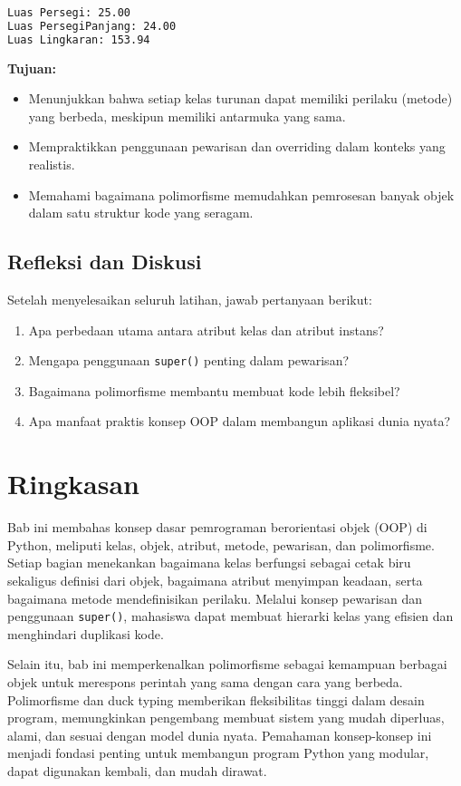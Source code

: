 \begin{lstlisting}[language=bash, caption={Output Program}]
Luas Persegi: 25.00
Luas PersegiPanjang: 24.00
Luas Lingkaran: 153.94
\end{lstlisting}

\textbf{Tujuan:}
\begin{itemize}
    \item Menunjukkan bahwa setiap kelas turunan dapat memiliki perilaku (metode) yang berbeda, meskipun memiliki antarmuka yang sama.
    \item Mempraktikkan penggunaan pewarisan dan overriding dalam konteks yang realistis.
    \item Memahami bagaimana polimorfisme memudahkan pemrosesan banyak objek dalam satu struktur kode yang seragam.
\end{itemize}


\subsection*{Refleksi dan Diskusi}
Setelah menyelesaikan seluruh latihan, jawab pertanyaan berikut:
\begin{enumerate}
    \item Apa perbedaan utama antara atribut kelas dan atribut instans?
    \item Mengapa penggunaan \texttt{super()} penting dalam pewarisan?
    \item Bagaimana polimorfisme membantu membuat kode lebih fleksibel?
    \item Apa manfaat praktis konsep OOP dalam membangun aplikasi dunia nyata?
\end{enumerate}

\section{Ringkasan}

Bab ini membahas konsep dasar pemrograman berorientasi objek (OOP) di Python, meliputi kelas, objek, atribut, metode, pewarisan, dan polimorfisme. Setiap bagian menekankan bagaimana kelas berfungsi sebagai cetak biru sekaligus definisi dari objek, bagaimana atribut menyimpan keadaan, serta bagaimana metode mendefinisikan perilaku. Melalui konsep pewarisan dan penggunaan \texttt{super()}, mahasiswa dapat membuat hierarki kelas yang efisien dan menghindari duplikasi kode.

Selain itu, bab ini memperkenalkan polimorfisme sebagai kemampuan berbagai objek untuk merespons perintah yang sama dengan cara yang berbeda. Polimorfisme dan duck typing memberikan fleksibilitas tinggi dalam desain program, memungkinkan pengembang membuat sistem yang mudah diperluas, alami, dan sesuai dengan model dunia nyata. Pemahaman konsep-konsep ini menjadi fondasi penting untuk membangun program Python yang modular, dapat digunakan kembali, dan mudah dirawat.


